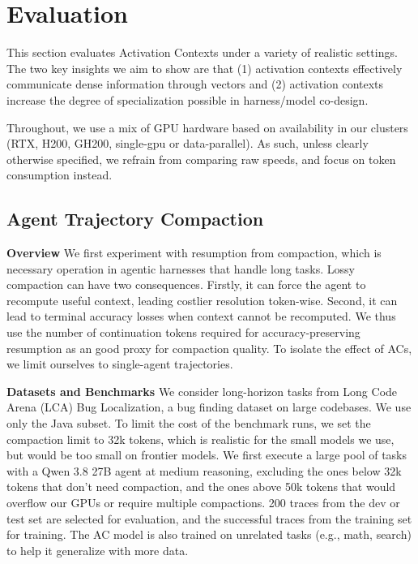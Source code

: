 \section{Evaluation}
This section evaluates Activation Contexts under a variety of realistic settings. The two key insights we aim to show are that (1) activation contexts effectively communicate dense information through vectors and (2) activation contexts increase the degree of specialization possible in harness/model co-design.

Throughout, we use a mix of GPU hardware based on availability in our clusters (RTX, H200, GH200, single-gpu or data-parallel). As such, unless clearly otherwise specified, we refrain from comparing raw speeds, and focus on token consumption instead.


\subsection{Agent Trajectory Compaction}
\textbf{Overview}
We first experiment with resumption from compaction, which is necessary operation in agentic harnesses that handle long tasks. Lossy compaction can have two consequences. Firstly, it can force the agent to recompute useful context, leading costlier resolution token-wise. Second, it can lead to terminal accuracy losses when context cannot be recomputed. We thus use the number of continuation tokens required for accuracy-preserving resumption as an good proxy for compaction quality. To isolate the effect of ACs, we limit ourselves to single-agent trajectories.

\textbf{Datasets and Benchmarks}
We consider long-horizon tasks from Long Code Arena (LCA) Bug Localization, a bug finding dataset on large codebases. We use only the Java subset. To limit the cost of the benchmark runs, we set the compaction limit to 32k tokens, which is realistic for the small models we use, but would be too small on frontier models. We first execute a large pool of tasks with a Qwen 3.8 27B agent at medium reasoning, excluding the ones below 32k tokens that don't need compaction, and the ones above 50k tokens that would overflow our GPUs or require multiple compactions. 200 traces from the dev or test set are selected for evaluation, and the successful traces from the training set for training. The AC model is also trained on unrelated tasks (e.g., math, search) to help it generalize with more data.

